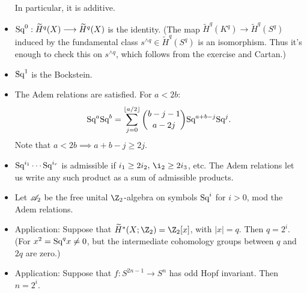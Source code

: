 \documentclass[11pt]{article}
\begin{document}
\begin{SteenrodTalk}
\begin{itemize}
In particular, it is additive.
\item 
$\textup{Sq}^0: \widetilde H^q (X) \longrightarrow \widetilde H^q (X)$ is the identity. (The map $\widetilde H^q(K^q)\to\widetilde H^q(S^q)$ induced by the fundamental class $s^{\wedge q}\in\widetilde H^q(S^q)$ is an isomorphism. Thus it's enough to check this on $s^{\wedge q}$, which follows from the exercise and Cartan.)
\item
$\textup{Sq}^1$ is the Bockstein.
\item The Adem relations are satisfied. For $a<2b$: 
\[
\textup{Sq}^a \textup{Sq}^b = \sum_{j=0}^{\lfloor a/2\rfloor} \binom{b-j-1}{a-2j} \textup{Sq}^{a+b-j} \textup{Sq}^j.
\]
Note that $a<2b\implies a+b-j\geq2j$.
\item $\textup{Sq}^{i_1}\cdots\textup{Sq}^{i_r}$ is admissible if $i_1\geq 2i_2,\,\i_2\geq 2i_3$, etc. The Adem relations let us write any such product as a sum of admissible products.
\item Let $\mathscr{A}_2$ be the free unital $\Z_2$-algebra on symbols $\textup{Sq}^i$ for $i>0$, mod the Adem relations.
\item Application: Suppose that $\widetilde H^*(X;\Z_2)=\Z_2[x]$, with $|x|=q$. Then $q=2^i$. (For $x^2=\textup{Sq}^{q}x\neq0$, but the intermediate cohomology groups between $q$ and $2q$ are zero.)
\item Application: Suppose that $f:S^{2n-1}\to S^n$ has odd Hopf invariant. Then $n=2^i$.
\end{itemize}

\pagebreak
\end{SteenrodTalk}
\end{document}
